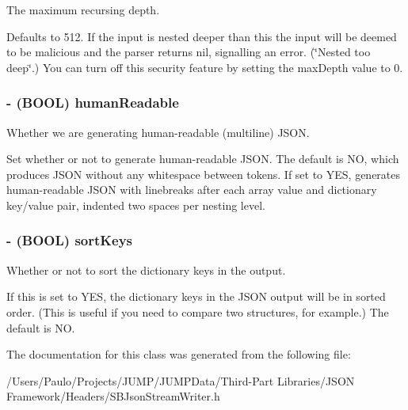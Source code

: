 The maximum recursing depth. 

Defaults to 512. If the input is nested deeper than this the input will be deemed to be malicious and the parser returns nil, signalling an error. (\char`\"{}Nested too deep\char`\"{}.) You can turn off this security feature by setting the maxDepth value to 0. \hypertarget{interface_s_b_json_stream_writer_af43e8bd7170d6128480515f532b7b791}{
\subsubsection[{humanReadable}]{\setlength{\rightskip}{0pt plus 5cm}-\/ (BOOL) humanReadable}}
\label{interface_s_b_json_stream_writer_af43e8bd7170d6128480515f532b7b791}


Whether we are generating human-\/readable (multiline) JSON. 

Set whether or not to generate human-\/readable JSON. The default is NO, which produces JSON without any whitespace between tokens. If set to YES, generates human-\/readable JSON with linebreaks after each array value and dictionary key/value pair, indented two spaces per nesting level. \hypertarget{interface_s_b_json_stream_writer_ab206c6844a0fd20307b5dfe881e17bf2}{
\subsubsection[{sortKeys}]{\setlength{\rightskip}{0pt plus 5cm}-\/ (BOOL) sortKeys}}
\label{interface_s_b_json_stream_writer_ab206c6844a0fd20307b5dfe881e17bf2}


Whether or not to sort the dictionary keys in the output. 

If this is set to YES, the dictionary keys in the JSON output will be in sorted order. (This is useful if you need to compare two structures, for example.) The default is NO. 

The documentation for this class was generated from the following file:\begin{DoxyCompactItemize}
\item 
/Users/Paulo/Projects/JUMP/JUMPData/Third-\/Part Libraries/JSON Framework/Headers/SBJsonStreamWriter.h\end{DoxyCompactItemize}
